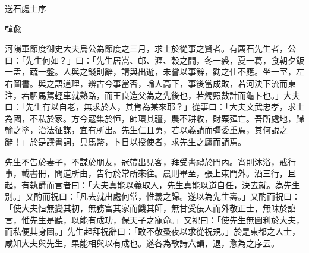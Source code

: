 送石處士序

韓愈

河陽軍節度御史大夫烏公為節度之三月，求士於從事之賢者。有薦石先生者，公曰：「先生何如？」曰：「先生居嵩、邙、湹、穀之間，冬一裘，夏一葛，食朝夕飯一盂，蔬一盤。人與之錢則辭，請與出遊，未嘗以事辭，勸之仕不應。坐一室，左右圖書。與之語道理，辨古今事當否，論人高下，事後當成敗，若河決下流而東注，若駟馬駕輕車就熟路，而王良造父為之先後也，若燭照數計而龜卜也。」大夫曰：「先生有以自老，無求於人，其肯為某來耶？」從事曰：「大夫文武忠孝，求士為國，不私於家。方今寇集於恒，師環其疆，農不耕收，財粟殫亡。吾所處地，歸輸之塗，治法征謀，宜有所出。先生仁且勇，若以義請而彊委重焉，其何說之辭！」於是譔書詞，具馬幣，卜日以授使者，求先生之廬而請焉。

先生不告於妻子，不謀於朋友，冠帶出見客，拜受書禮於門內。宵則沐浴，戒行事，載書冊，問道所由，告行於常所來往。晨則畢至，張上東門外。酒三行，且起，有執爵而言者曰：「大夫真能以義取人，先生真能以道自任，決去就。為先生別。」又酌而祝曰：「凡去就出處何常，惟義之歸。遂以為先生壽。」又酌而祝曰：「使大夫恒無變其初，無務富其家而饑其師，無甘受佞人而外敬正士，無味於諂言，惟先生是聽，以能有成功，保天子之寵命。」又祝曰：「使先生無圖利於大夫，而私便其身圖。」先生起拜祝辭曰：「敢不敬蚤夜以求從祝規。」於是東都之人士，咸知大夫與先生，果能相與以有成也。遂各為歌詩六韻，退，愈為之序云。